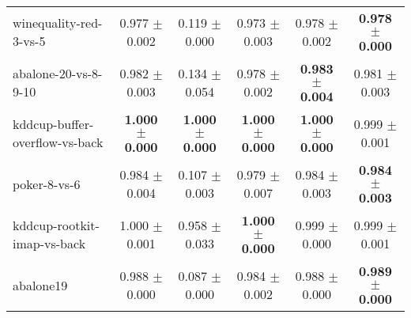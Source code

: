 \begin{table}[!ht]
{\begin{tabular}{l c c c c c}
winequality-red-3-vs-5 & 0.977 $\pm$ 0.002 & 0.119 $\pm$ 0.000 & 0.973 $\pm$ 0.003 & 0.978 $\pm$ 0.002 & \textbf{0.978 $\pm$ 0.000} \\
abalone-20-vs-8-9-10 & 0.982 $\pm$ 0.003 & 0.134 $\pm$ 0.054 & 0.978 $\pm$ 0.002 & \textbf{0.983 $\pm$ 0.004} & 0.981 $\pm$ 0.003 \\
kddcup-buffer-overflow-vs-back & \textbf{1.000 $\pm$ 0.000} & \textbf{1.000 $\pm$ 0.000} & \textbf{1.000 $\pm$ 0.000} & \textbf{1.000 $\pm$ 0.000} & 0.999 $\pm$ 0.001 \\
poker-8-vs-6 & 0.984 $\pm$ 0.004 & 0.107 $\pm$ 0.003 & 0.979 $\pm$ 0.007 & 0.984 $\pm$ 0.003 & \textbf{0.984 $\pm$ 0.003} \\
kddcup-rootkit-imap-vs-back & 1.000 $\pm$ 0.001 & 0.958 $\pm$ 0.033 & \textbf{1.000 $\pm$ 0.000} & 0.999 $\pm$ 0.000 & 0.999 $\pm$ 0.001 \\
abalone19 & 0.988 $\pm$ 0.000 & 0.087 $\pm$ 0.000 & 0.984 $\pm$ 0.002 & 0.988 $\pm$ 0.000 & \textbf{0.989 $\pm$ 0.000} \\
\end{tabular}}
\end{table}
